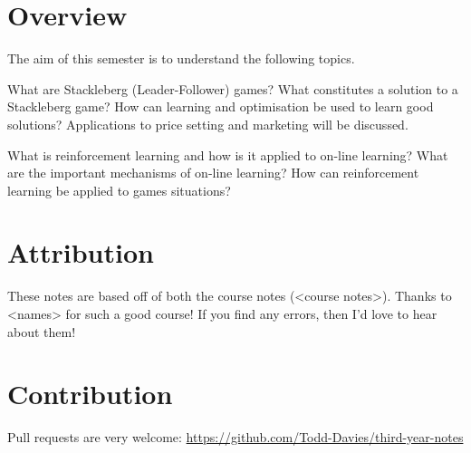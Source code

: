\section*{Overview}

The aim of this semester is to understand the following topics.

What are Stackleberg (Leader-Follower) games? What constitutes a solution to a
Stackleberg game? How can learning and optimisation be used to learn good
solutions? Applications to price setting and marketing will be discussed.

What is reinforcement learning and how is it applied to on-line learning? What
are the important mechanisms of on-line learning? How can reinforcement learning
be applied to games situations?

\section*{Attribution}

These notes are based off of both the course notes (<course notes>). Thanks to
<names> for such a good course! If you find any errors, then I'd love to hear
about them!

\section*{Contribution}

Pull requests are very welcome:
\url{https://github.com/Todd-Davies/third-year-notes}